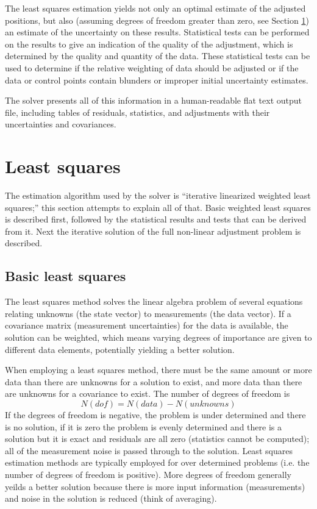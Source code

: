 The least squares estimation yields not only an optimal estimate of the adjusted positions, but also (assuming degrees of freedom greater than zero, see Section \ref{sec:leastsquaressec}) an estimate of the uncertainty on these results. Statistical tests can be performed on the results to give an indication of the quality of the adjustment, which is determined by the quality and quantity of the data. These statistical tests can be used to determine if the relative weighting of data should be adjusted or if the data or control points contain blunders or improper initial uncertainty estimates.

The solver presents all of this information in a human-readable flat text output file, including tables of residuals, statistics, and adjustments with their uncertainties and covariances.

\section{Least squares}
\label{sec:leastsquaressec}
The estimation algorithm used by the solver is ``iterative linearized weighted least squares;'' this section attempts to explain all of that. Basic weighted least squares is described first, followed by the statistical results and tests that can be derived from it. Next the iterative solution of the full non-linear adjustment problem is described.

\subsection{Basic least squares} \label{sect:BasicLeastSquares}
The least squares method solves the linear algebra problem of several equations relating unknowns (the state vector) to measurements (the data vector). If a covariance matrix (measurement uncertainties) for the data is available, the solution can be weighted, which means varying degrees of importance are given to different data elements, potentially yielding a better solution.

When employing a least squares method, there must be the same amount or more data than there are unknowns for a solution to exist, and more data than there are unknowns for a covariance to exist. The number of degrees of freedom is
\begin{equation}
N(dof) = N(data) - N(unknowns)
\end{equation}
If the degrees of freedom is negative, the problem is under determined and there is no solution, if it is zero the problem is evenly determined and there is a solution but it is exact and residuals are all zero (statistics cannot be computed); all of the measurement noise is passed through to the solution. Least squares estimation methods are typically employed for over determined problems (i.e. the number of degrees of freedom is positive). More degrees of freedom generally yeilds a better solution because there is more input information (measurements) and noise in the solution is reduced (think of averaging). 

